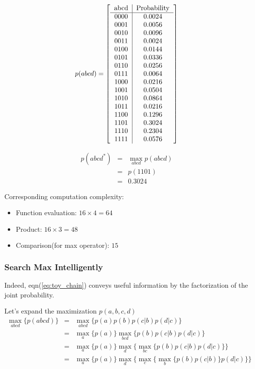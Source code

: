\documentclass[11pt,a4paper]{article}
\begin{document}
\begin{equation}
p(abcd)=\left[ 
\begin{tabular}{c|c}
abcd & Probability \\
\hline
  0000 & 0.0024 \\
  0001 & 0.0056 \\ 
  0010 & 0.0096 \\ 
  0011 & 0.0024 \\ 
  0100 & 0.0144 \\ 
  0101 & 0.0336 \\ 
  0110 & 0.0256 \\ 
  0111 & 0.0064 \\ 
  1000 & 0.0216 \\ 
  1001 & 0.0504 \\ 
  1010 & 0.0864 \\ 
  1011 & 0.0216 \\ 
  1100 & 0.1296 \\ 
  1101 & 0.3024 \\ 
  1110 & 0.2304 \\ 
  1111 & 0.0576 \\ 
\end{tabular} \right]
\end{equation}

\begin{eqnarray}
	p(abcd^*) &=& \max_{abcd}{p(abcd)} \\
	&=& p(1101) \\ 
	&=& 0.3024 
\end{eqnarray}

Corresponding computation complexity:
\begin{itemize}
	\item Function evaluation: $16 \times 4 = 64$
	\item Product: $16 \times 3 = 48$
	\item Comparison(for max operator): $15$
\end{itemize}

\subsubsection{Search Max Intelligently}
Indeed, eqn(\ref{eq:toy_chain}) conveys useful information by the 
factorization of the joint probability. 

Let's expand the maximization $p(a,b,c,d)$
\begin{eqnarray}
\max_{abcd} \{ p(abcd) \} &=& \max_{abcd} \{ p(a)p(b)p(c|b)p(d|c) \} \\
&=& \max_{a} \{ p(a) \} \max_{bcd} \{ p(b)p(c|b)p(d|c) \}  \\
&=& \max_{a} \{ p(a) \} \max_{d} \{ \max_{bc} \{p(b)p(c|b)p(d|c)\} \}  \\
&=& \max_{a} \{ p(a) \} \max_{d} \{ \max_{c} \{\max_{b} \{p(b)p(c|b) \} p(d|c)\} \}  
\end{eqnarray}
\end{document}

